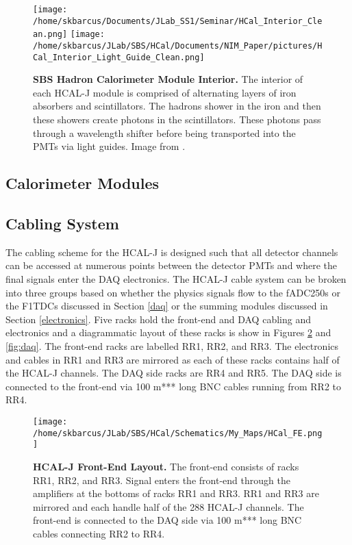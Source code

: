 \documentclass[review]{elsarticle}
\newcommand{\hcal}{HCAL-J }
\begin{document}
	\begin{figure}[!ht]
	\begin{center}
	\texttt{[image: /home/skbarcus/Documents/JLab\_SS1/Seminar/HCal\_Interior\_Clean.png]}
	\texttt{[image: /home/skbarcus/JLab/SBS/HCal/Documents/NIM\_Paper/pictures/HCal\_Interior\_Light\_Guide\_Clean.png]}
	\end{center}
	\caption{
	{\bf{SBS Hadron Calorimeter Module Interior.}} The interior of each \hcal module is comprised of alternating layers of iron absorbers and scintillators. The hadrons shower in the iron and then these showers create photons in the scintillators. These photons pass through a wavelength shifter before being transported into the PMTs via light guides. Image from \cite{brio_2018}.}
	\label{fig:HCal_interior}
	\end{figure}	

\subsection{Calorimeter Modules}
\label{modules}

\subsection{Cabling System}
\label{cables}

The cabling scheme for the \hcal is designed such that all detector channels can be accessed at numerous points between the detector PMTs and where the final signals enter the DAQ electronics. The \hcal cable system can be broken into three groups based on whether the physics signals flow to the fADC250s or the F1TDCs discussed in Section \ref{daq} or the summing modules discussed in Section \ref{electronics}. Five racks hold the front-end and DAQ cabling and electronics and a diagrammatic layout of these racks is show in Figures \ref{fig:fe} and \ref{fig:daq}. The front-end racks are labelled RR1, RR2, and RR3. The electronics and cables in RR1 and RR3 are mirrored as each of these racks contains half of the \hcal channels. The DAQ side racks are RR4 and RR5. The DAQ side is connected to the front-end via 100 m*** long BNC cables running from RR2 to RR4. \\ 

	\begin{figure}[!ht]
	\begin{center}
	\texttt{[image: /home/skbarcus/JLab/SBS/HCal/Schematics/My\_Maps/HCal\_FE.png]}
	\end{center}
	\caption{
	{\bf{\hcal Front-End Layout.}} The front-end consists of racks RR1, RR2, and RR3. Signal enters the front-end through the amplifiers at the bottoms of racks RR1 and RR3. RR1 and RR3 are mirrored and each handle half of the 288 \hcal channels. The front-end is connected to the DAQ side via 100 m*** long BNC cables connecting RR2 to RR4.}
	\label{fig:fe}
	\end{figure}	
	
\end{document}
